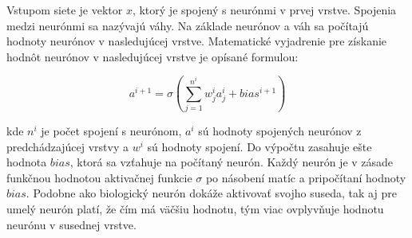 Vstupom siete je vektor \begin{math}x\end{math}, ktorý je spojený s neurónmi v prvej vrstve. Spojenia medzi neurónmi sa nazývajú váhy. Na základe neurónov a váh sa počítajú hodnoty neurónov v nasledujúcej vrstve. Matematické vyjadrenie pre získanie hodnôt neurónov v nasledujúcej vrstve je opísané formulou:

\begingroup
\large
\begin{equation}a^{i+1} = \sigma \left ( \sum_{j=1}^{n^i} w_{j}^i a_{j}^i + bias^{i+1} \right ) \end{equation}
\endgroup

kde \begin{math}n^{i}\end{math} je počet spojení s neurónom, \begin{math}a^{i}\end{math} sú hodnoty spojených neurónov z predchádzajúcej vrstvy a \begin{math}w^{i}\end{math} sú hodnoty spojení. Do výpočtu zasahuje ešte hodnota \begin{math}bias\end{math}, ktorá sa vzťahuje na počítaný neurón. Každý neurón je v zásade funkčnou hodnotou aktivačnej funkcie \begin{math}\sigma\end{math} po násobení matíc a pripočítaní hodnoty \begin{math}bias\end{math}. Podobne ako biologický neurón dokáže aktivovať svojho suseda, tak aj pre umelý neurón platí, že čím má väčšiu hodnotu, tým viac ovplyvňuje hodnotu neurónu v susednej vrstve.


